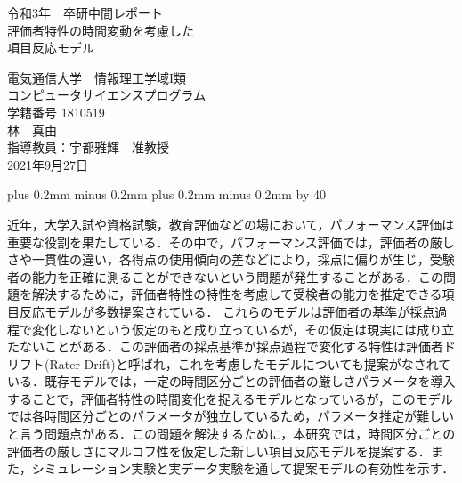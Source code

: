 \documentclass[a4paper,11pt,oneside,openany]{jsbook}
\def\kcharparline#1{%
   \ifx\xkanjiskip\undefined%
   \jintercharskip 0mm plus 0.2mm minus 0.2mm
   \else
   \xkanjiskip 0mm plus 0.2mm minus 0.2mm
   \fi
   \settowidth{\textwidth}{}%
   \multiply\textwidth by #1}
\begin{document}
\begin{titlepage}

\begin{center}
{\Large 令和3年　卒研中間レポート}\\ %
\vspace*{150truept}
{\huge 評価者特性の時間変動を考慮した\\項目反応モデル}\\ %
\vspace{120truept}

{\huge 電気通信大学　情報理工学域I類}\\ %
\vspace{10truept}
{\huge コンピュータサイエンスプログラム}\\ %
\vspace{10truept}
{\huge 学籍番号 1810519}\\ %
\vspace{50truept}
{\huge 林　真由}\\ %
\vspace{50truept}
{\huge 指導教員：宇都雅輝　准教授}\\
\vspace{50truept}
{\huge 2021年9月27日}\\ %
\end{center}
\end{titlepage}
\kcharparline{40} %

\frontmatter
近年，大学入試や資格試験，教育評価などの場において，パフォーマンス評価は重要な役割を果たしている．その中で，パフォーマンス評価では，評価者の厳しさや一貫性の違い，各得点の使用傾向の差などにより，採点に偏りが生じ，受験者の能力を正確に測ることができないという問題が発生することがある．この問題を解決するために，評価者特性の特性を考慮して受検者の能力を推定できる項目反応モデルが多数提案されている．
これらのモデルは評価者の基準が採点過程で変化しないという仮定のもと成り立っているが，その仮定は現実には成り立たないことがある．この評価者の採点基準が採点過程で変化する特性は評価者ドリフト(Rater Drift)と呼ばれ，これを考慮したモデルについても提案がなされている．既存モデルでは，一定の時間区分ごとの評価者の厳しさパラメータを導入することで，評価者特性の時間変化を捉えるモデルとなっているが，このモデルでは各時間区分ごとのパラメータが独立しているため，パラメータ推定が難しいと言う問題点がある．この問題を解決するために，本研究では，時間区分ごとの評価者の厳しさにマルコフ性を仮定した新しい項目反応モデルを提案する．また，シミュレーション実験と実データ実験を通して提案モデルの有効性を示す．
\tableofcontents
%
%
\mainmatter
\end{document}
